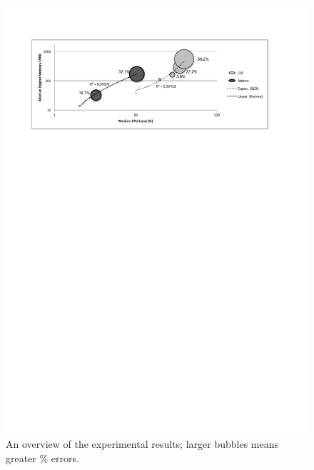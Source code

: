 \begin{figure}[t]
\centering
\includegraphics[width=\textwidth]{img/comp-mod-cpu-mem-acerror}
\caption{An overview of the experimental results; larger  bubbles means greater \% errors.}
\label{fig:cpu-mem}
\end{figure}

